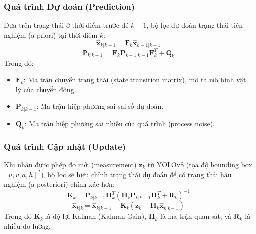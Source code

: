 \subsubsection{Quá trình Dự đoán (Prediction)}
Dựa trên trạng thái ở thời điểm trước đó $k-1$, bộ lọc dự đoán trạng thái tiên nghiệm (a priori) tại thời điểm $k$:
\begin{equation}
    \hat{\mathbf{x}}_{k|k-1} = \mathbf{F}_k \hat{\mathbf{x}}_{k-1|k-1}
\end{equation}
\begin{equation}
    \mathbf{P}_{k|k-1} = \mathbf{F}_k \mathbf{P}_{k-1|k-1} \mathbf{F}_k^T + \mathbf{Q}_k
\end{equation}
Trong đó:
\begin{itemize}
    \item $\mathbf{F}_k$: Ma trận chuyển trạng thái (state transition matrix), mô tả mô hình vật lý của chuyển động.
    \item $\mathbf{P}_{k|k-1}$: Ma trận hiệp phương sai sai số dự đoán.
    \item $\mathbf{Q}_k$: Ma trận hiệp phương sai nhiễu của quá trình (process noise).
\end{itemize}

\subsubsection{Quá trình Cập nhật (Update)}
Khi nhận được phép đo mới (measurement) $\mathbf{z}_k$ từ YOLOv8 (tọa độ bounding box $[u, v, a, h]^T$), bộ lọc sẽ hiệu chỉnh trạng thái dự đoán để có trạng thái hậu nghiệm (a posteriori) chính xác hơn:
\begin{equation}
    \mathbf{K}_k = \mathbf{P}_{k|k-1} \mathbf{H}_k^T (\mathbf{H}_k \mathbf{P}_{k|k-1} \mathbf{H}_k^T + \mathbf{R}_k)^{-1}
\end{equation}
\begin{equation}
    \hat{\mathbf{x}}_{k|k} = \hat{\mathbf{x}}_{k|k-1} + \mathbf{K}_k (\mathbf{z}_k - \mathbf{H}_k \hat{\mathbf{x}}_{k|k-1})
\end{equation}
Trong đó $\mathbf{K}_k$ là độ lợi Kalman (Kalman Gain), $\mathbf{H}_k$ là ma trận quan sát, và $\mathbf{R}_k$ là nhiễu đo lường.

